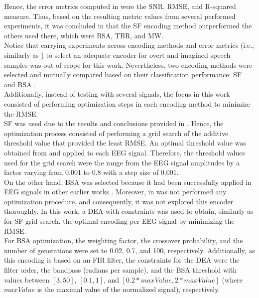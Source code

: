 Hence, the error metrics computed in \cite{petro2019selection} were the SNR, RMSE, and R-squared measure. Thus, based on the resulting metric values from several performed experiments, it was concluded in \cite{petro2019selection} that the SF encoding method outperformed the others used there, which were BSA, TBR, and MW.\\

Notice that carrying experiments across encoding methods and error metrics (i.e., similarly as \cite{petro2019selection}) to select an adequate encoder for overt and imagined speech samples was out of scope for this work. Nevertheless, two encoding methods were selected and mutually compared based on their classification performance: SF \cite{kasabov2016evolving} and BSA \cite{schrauwen2003bsa}.\\

Additionally, instead of testing with several signals, the focus in this work consisted of performing optimization steps in each encoding method to minimize the RMSE.\\

SF was used due to the results and conclusions provided in \cite{petro2019selection}. Hence, the optimization process consisted of performing a grid search of the additive threshold value that provided the least RMSE. An optimal threshold value was obtained from and applied to each EEG signal. Therefore, the threshold values used for the grid search were the range from the EEG signal amplitudes by a factor varying from 0.001 to 0.8 with a step size of 0.001.\\

On the other hand, BSA was selected because it had been successfully applied in EEG signals in other earlier works \cite{kasabov2014neucube,nuntalid2011eeg}. Moreover, in  \cite{petro2019selection} was not performed any optimization procedure, and consequently, it was not explored this encoder thoroughly. In this work, a DEA \cite{storn1997differential} with constraints was used to obtain, similarly as for SF grid search, the optimal encoding per EEG signal by minimizing the RMSE.\\

For BSA optimization, the weighting factor, the crossover probability, and the number of generations were set to 0.02, 0.7, and 100, respectively. Additionally, as this encoding is based on an FIR filter, the constraints for the DEA were the filter order, the bandpass (radians per sample), and the BSA threshold with values between $[3,50]$, $[0.1,1]$, and $[0.2*maxValue,2*maxValue]$ (where $maxValue$ is the maximal value of the normalized signal), respectively.\\

